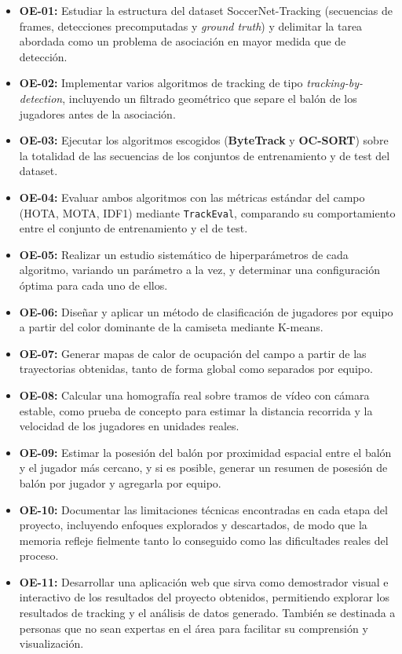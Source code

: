 \begin{itemize}
  \item \textbf{OE-01:} Estudiar la estructura del dataset
        SoccerNet-Tracking (secuencias de frames, detecciones precomputadas
        y \emph{ground truth}) y delimitar la tarea abordada como un
        problema de asociación en mayor medida que de detección.
  \item \textbf{OE-02:} Implementar varios algoritmos de tracking de tipo
        \emph{tracking-by-detection}, incluyendo un
        filtrado geométrico que separe el balón de los jugadores antes de
        la asociación.
  \item \textbf{OE-03:} Ejecutar los algoritmos escogidos (\textbf{ByteTrack} y
        \textbf{OC-SORT}) sobre la totalidad de las
        secuencias de los conjuntos de entrenamiento y de test del dataset.
  \item \textbf{OE-04:} Evaluar ambos algoritmos con las métricas estándar
        del campo (HOTA, MOTA, IDF1) mediante \texttt{TrackEval}, comparando
        su comportamiento entre el conjunto de entrenamiento y el de test.
  \item \textbf{OE-05:} Realizar un estudio sistemático de hiperparámetros
        de cada algoritmo, variando un parámetro a la vez, y determinar una
        configuración óptima para cada uno de ellos.
  \item \textbf{OE-06:} Diseñar y aplicar un método de clasificación de
        jugadores por equipo a partir del color dominante de la camiseta
        mediante K-means.
  \item \textbf{OE-07:} Generar mapas de calor de ocupación del campo a
        partir de las trayectorias obtenidas, tanto de forma global como
        separados por equipo.
  \item \textbf{OE-08:} Calcular una homografía real sobre tramos de vídeo
        con cámara estable, como prueba de concepto para estimar la
        distancia recorrida y la velocidad de los jugadores en unidades
        reales.
  \item \textbf{OE-09:} Estimar la posesión del balón por proximidad
        espacial entre el balón y el jugador más cercano, y si es posible, 
        generar un resumen de posesión de balón por jugador y
        agregarla por equipo.
  \item \textbf{OE-10:} Documentar las limitaciones
        técnicas encontradas en cada etapa del proyecto, incluyendo
        enfoques explorados y descartados, de modo que la memoria refleje
        fielmente tanto lo conseguido como las dificultades reales del
        proceso.
  \item \textbf{OE-11:} Desarrollar una aplicación web que sirva como
        demostrador visual e interactivo de los resultados del proyecto obtenidos,
        permitiendo explorar los
        resultados de tracking y el análisis de datos generado. También se
        destinada a personas que no sean expertas en el área para facilitar
        su comprensión y visualización.
\end{itemize}

